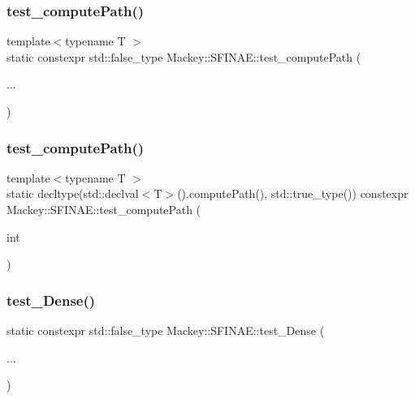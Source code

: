 \subsubsection{\texorpdfstring{test\+\_\+compute\+Path()}{test\_computePath()}\hspace{0.1cm}{\footnotesize\ttfamily [1/2]}}
{\footnotesize\ttfamily template$<$typename T $>$ \\
static constexpr std\+::false\+\_\+type Mackey\+::\+S\+F\+I\+N\+A\+E\+::test\+\_\+compute\+Path (\begin{DoxyParamCaption}\item[{}]{... }\end{DoxyParamCaption})\hspace{0.3cm}{\ttfamily [static]}}

\mbox{\label{structMackey_1_1SFINAE_acf66cc5b3fd626fc1c6d4fa80832c152}} 
\subsubsection{\texorpdfstring{test\+\_\+compute\+Path()}{test\_computePath()}\hspace{0.1cm}{\footnotesize\ttfamily [2/2]}}
{\footnotesize\ttfamily template$<$typename T $>$ \\
static decltype(std\+::declval$<$T$>$().compute\+Path(), std\+::true\+\_\+type()) constexpr Mackey\+::\+S\+F\+I\+N\+A\+E\+::test\+\_\+compute\+Path (\begin{DoxyParamCaption}\item[{int}]{ }\end{DoxyParamCaption})\hspace{0.3cm}{\ttfamily [static]}}

\mbox{\label{structMackey_1_1SFINAE_a1b75937bad3b6d9d0eaff8bd81a03b16}} 
\subsubsection{\texorpdfstring{test\+\_\+\+Dense()}{test\_Dense()}\hspace{0.1cm}{\footnotesize\ttfamily [1/2]}}
{\footnotesize\ttfamily static constexpr std\+::false\+\_\+type Mackey\+::\+S\+F\+I\+N\+A\+E\+::test\+\_\+\+Dense (\begin{DoxyParamCaption}\item[{}]{... }\end{DoxyParamCaption})\hspace{0.3cm}{\ttfamily [static]}}

